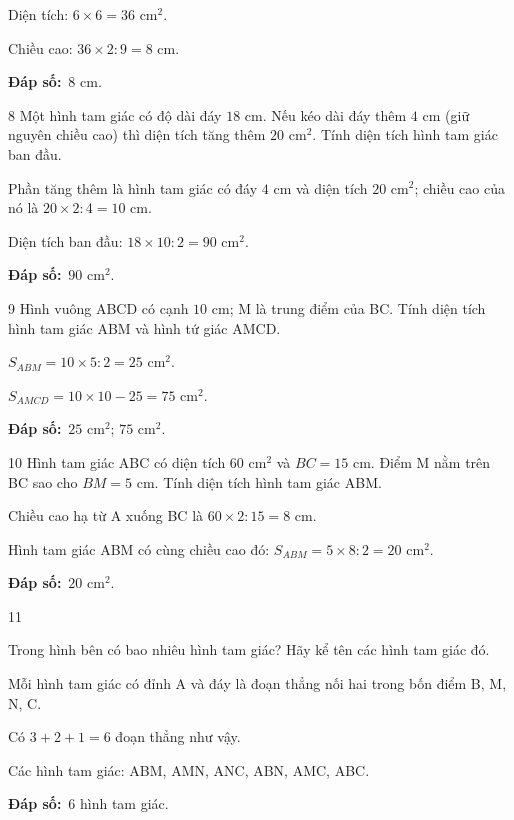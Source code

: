 \documentclass[11pt]{article}
\newif\ifsol \solfalse
\providecommand{\AnsWord}{Đáp số}
\newcommand{\dapso}[1]{\par\textbf{\AnsWord:}\ #1}
\newcommand{\probsol}[1]{%
  \begin{lrbox}{\solmeasure}\begin{minipage}{\dimexpr\linewidth-24pt\relax}#1\end{minipage}\end{lrbox}%
  \ifsol
    \begin{solbox}#1\end{solbox}%
  \else
    \setlength{\solht}{\dimexpr\ht\solmeasure+\dp\solmeasure+0.85cm\relax}%
    \ifdim\solht<1.35cm\setlength{\solht}{1.35cm}\fi
    \begin{tcolorbox}[colback=white,colframe=Line,boxrule=0.8pt,arc=5pt,
      left=8pt,right=8pt,top=4pt,bottom=4pt,height=\solht]{\footnotesize\color{Slate}\itshape\WorkWord}\end{tcolorbox}%
  \fi}
\newcommand{\gap}{\vspace{0.3cm}}
\def\WorkWord{Bài làm:}
\def\AnsWord{Đáp số}
\begin{document}
\probsol{
Diện tích: $6\times6=36$ cm$^2$.\par Chiều cao: $36\times2:9=8$ cm.
\dapso{$8$ cm.}}
\gap
\begin{probbox}{8}{\relax}
Một hình tam giác có độ dài đáy $18$ cm. Nếu kéo dài đáy thêm $4$ cm (giữ nguyên chiều cao) thì diện tích tăng thêm $20$ cm$^2$. Tính diện tích hình tam giác ban đầu.
\end{probbox}
\probsol{
Phần tăng thêm là hình tam giác có đáy $4$ cm và diện tích $20$ cm$^2$; chiều cao của nó là $20\times2:4=10$ cm.\par
Diện tích ban đầu: $18\times10:2=90$ cm$^2$.
\dapso{$90$ cm$^2$.}}
\gap
\begin{probbox}{9}{\relax}
Hình vuông ABCD có cạnh $10$ cm; M là trung điểm của BC. Tính diện tích hình tam giác ABM và hình tứ giác AMCD.
\end{probbox}
\probsol{
$S_{ABM}=10\times5:2=25$ cm$^2$.\par $S_{AMCD}=10\times10-25=75$ cm$^2$.
\dapso{$25$ cm$^2$; $75$ cm$^2$.}}
\gap
\begin{probbox}{10}{\relax}
Hình tam giác ABC có diện tích $60$ cm$^2$ và $BC=15$ cm. Điểm M nằm trên BC sao cho $BM=5$ cm. Tính diện tích hình tam giác ABM.
\end{probbox}
\probsol{
Chiều cao hạ từ A xuống BC là $60\times2:15=8$ cm.\par Hình tam giác ABM có cùng chiều cao đó: $S_{ABM}=5\times8:2=20$ cm$^2$.
\dapso{$20$ cm$^2$.}}
\gap
\begin{probbox}{11}{\relax}
\begin{minipage}[t]{0.62\linewidth}
Trong hình bên có bao nhiêu hình tam giác? Hãy kể tên các hình tam giác đó.
\end{minipage}\hfill
\begin{minipage}[t]{0.34\linewidth}\vspace{0pt}\centering
{}
\end{minipage}
\end{probbox}
\probsol{
Mỗi hình tam giác có đỉnh A và đáy là đoạn thẳng nối hai trong bốn điểm B, M, N, C.\par Có $3+2+1=6$ đoạn thẳng như vậy.\par
Các hình tam giác: ABM, AMN, ANC, ABN, AMC, ABC.
\dapso{$6$ hình tam giác.}}
\end{document}
